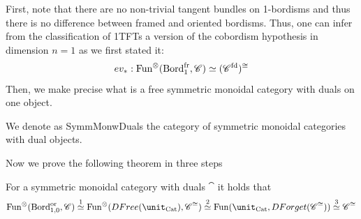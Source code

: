  First, note that there are no non-trivial tangent bundles on 1-bordisms and thus there is no difference between 
 framed and oriented bordisms. Thus, one can infer from the classification of 1TFTs a version of the cobordism 
 hypothesis in dimension $n=1$ as we first stated it:
 $$ev_{\ast}:\operatorname{Fun}^{\otimes}(\operatorname{Bord}_{1}^{\operatorname{fr}},\mathscr{C})\simeq (\mathscr{C}^{\operatorname{fd}})^{\cong}$$
  Then, we make precise what is a free symmetric monoidal category with duals on one object.
\begin{notat}
We denote as SymmMonwDuals the category of symmetric monoidal categories with dual objects.
\end{notat}
Now we prove the following theorem in three steps
\begin{thm}
	For a symmetric monoidal category with duals $\cat$ it holds that
	$$\Fun^{\otimes}(\Bord_{1,0}^{\operatorname{or}},\cat)\overset{1}{\simeq}\Fun^{\otimes}(DFree(\unit_{\Cat}),\cat^{\cong})\overset{2}{\simeq}\Fun(\unit_{\Cat},DForget(\cat^{\cong}))\overset{3}{\simeq} \cat^{\cong}$$
\end{thm}
